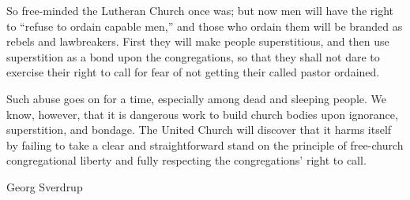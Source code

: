 So free-minded the Lutheran Church once was; but now men will have the right to “refuse to ordain capable men,” and those who ordain them will be branded as rebels and lawbreakers. First they will make people superstitious, and then use superstition as a bond upon the congregations, so that they shall not dare to exercise their right to call for fear of not getting their called pastor ordained.

Such abuse goes on for a time, especially among dead and sleeping people. We know, however, that it is dangerous work to build church bodies upon ignorance, superstition, and bondage. The United Church will discover that it harms itself by failing to take a clear and straightforward stand on the principle of free-church congregational liberty and fully respecting the congregations’ right to call.

Georg Sverdrup

